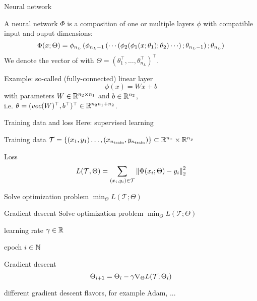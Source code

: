 \begin{frame}{Neural network}
  \begin{definition}
    A neural network $\Phi$ is a composition of one or multiple layers $\phi$ 
    with compatible input and ouput dimensions:
    \begin{equation*}
      \Phi(x;\Theta) = \phi_{n_L} \lb \phi_{n_L-1} \lb \cdots
      \lb \phi_2(
      \phi_1(x;\theta_1); \theta_2 ) \cdots \rb ; \theta_{n_L-1} \rb ; \theta_{n_L} \rb
    \end{equation*}
    We denote the vector of
     with $\Theta = (\theta_1^\top, \dots, \theta_{n_L}^\top)^\top$.
  \end{definition}
  
  Example: so-called (fully-connected) linear layer
  \begin{equation*}
    \phi(x) = Wx +b
  \end{equation*}
  with parameters $W \in \R^{n_2 \times n_1}$ 
  and $b \in \R^{n_2}$,\\
  i.e. $\theta = (vec(W)^\top, b^\top)^\top \in \R^{n_2 n_1 + n_2}$.
\end{frame}

\begin{frame}{Training data and loss}
  Here: supervised learning

  \begin{block}{Training data}
    $\mathcal{T} = \{(x_1, y_1) \dots, (x_{n_{\text{train}}},y_{n_{\text{train}}}) \}
   \subset \R^{n_x} \times \R^{n_y}$
  \end{block}

  \begin{block}{Loss}
    \begin{equation*}
      L(\mathcal{T}, \Theta) = 
      \sum_{(x_i, y_i) \in \mathcal{T}} \norm{\Phi(x_i; \Theta) - y_i}^2_2
    \end{equation*}
  \end{block} 

  \vspace{0.3cm}
   Solve optimization problem $\min_\Theta L(\mathcal{T}; \Theta)$
\end{frame}

\begin{frame}[c]{Gradient descent}
   Solve optimization problem $\min_\Theta L(\mathcal{T}; \Theta)$
  \vspace{0.3cm}

  learning rate $\gamma \in  \R$

  epoch $i \in \N$
  \begin{block}{Gradient descent}
    \begin{equation*}
      \Theta_{i+1} = \Theta_i - \gamma \grad[\Theta]{L(\mathcal{T};\Theta_{i})}
    \end{equation*}
  \end{block}

  different gradient descent flavors, for example Adam, ...
\end{frame}

